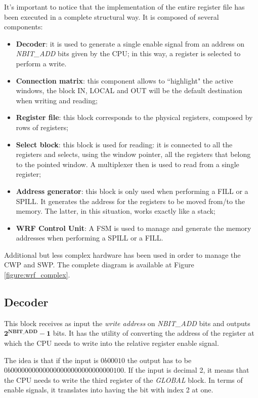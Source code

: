 It's important to notice that the implementation of the entire register file has been executed in a complete structural way. It is composed of several components:
\begin{itemize}
	\item \textbf{Decoder}: it is used to generate a single enable signal from an address on \emph{NBIT\_ADD} bits given by the CPU; in this way, a register is selected to perform a write. 
	\item \textbf{Connection matrix}: this component allows to ``highlight" the active windows, the block IN, LOCAL and OUT will be the default destination when writing and reading;
	\item \textbf{Register file}: this block corresponds to the physical registers, composed by rows of registers;
	\item \textbf{Select block}: this block is used for reading: it is connected to all the registers and selects, using the window pointer, all the registers that belong to the pointed window. A multiplexer then is used to read from a single register;
	\item \textbf{Address generator}: this block is only used when performing a FILL or a SPILL. It generates the address for the registers to be moved from/to the memory. The latter, in this situation, works exactly like a stack;
	\item \textbf{WRF Control Unit}: A FSM is used to manage and generate the memory addresses when performing a SPILL or a FILL.
\end{itemize}

Additional but less complex hardware has been used in order to manage the CWP and SWP. The complete diagram is available at Figure \ref{figure:wrf_complex}.


\subsection{Decoder}
This block receives as input the \emph{write address} on \emph{NBIT\_ADD} bits and outputs \(\mathbf{2^{NBIT\_ADD} - 1} \) bits. It has the utility of converting the address of the register at which the CPU needs to write into the relative register enable signal. 

The idea is that if the input is \(0b00010\) the output has to be \(0b00000000000000000000000000000100\). If the input is decimal 2, it means that the CPU needs to write the third register of the \emph{GLOBAL} block. In terms of enable signals, it translates into having the bit with index 2 at one. \\

